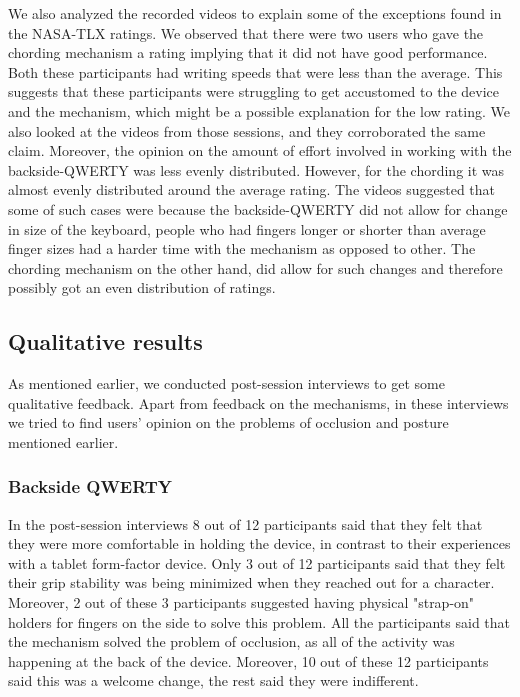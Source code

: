 We also analyzed the recorded videos to explain some of the exceptions found in the NASA-TLX ratings. We observed that there were two users who gave the chording mechanism a rating implying that it did not have good performance. Both these participants had writing speeds that were less than the average. This suggests that these participants were struggling to get accustomed to the device and the mechanism, which might be a possible explanation for the low rating. We also looked at the videos from those sessions, and they corroborated the same claim. Moreover, the opinion on the amount of effort involved in working with the backside-QWERTY was less evenly distributed. However, for the chording it was almost evenly distributed around the average rating. The videos suggested that some of such cases were because the backside-QWERTY did not allow for change in size of the keyboard, people who had fingers longer or shorter than average finger sizes had a harder time with the mechanism as opposed to other. The chording mechanism on the other hand, did allow for such changes and therefore possibly got an even distribution of ratings.

\subsection{Qualitative results}
As mentioned earlier, we conducted post-session interviews to get some qualitative feedback. Apart from feedback on the mechanisms, in these interviews we tried to find users' opinion on the problems of occlusion and posture mentioned earlier.
\subsubsection{Backside QWERTY}
In the post-session interviews 8 out of 12 participants said that they felt that they were more comfortable in holding the device, in contrast to their experiences with a tablet form-factor device.
Only 3 out of 12 participants said that they felt their grip stability was being minimized when they reached out for a character. Moreover, 2 out of these 3 participants suggested having physical "strap-on" holders for fingers on the side to solve this problem. All the participants said that the mechanism solved the problem of occlusion, as all of the activity was happening at the back of the device. Moreover, 10 out of these 12 participants said this was a welcome change, the rest said they were indifferent.
